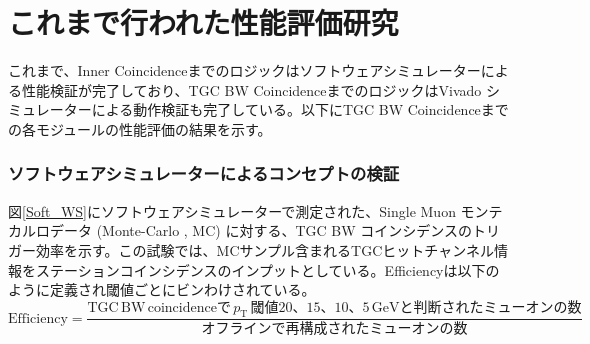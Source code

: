 \section{これまで行われた性能評価研究}
これまで、Inner Coincidenceまでのロジックはソフトウェアシミュレーターによる性能検証が完了しており、TGC BW CoincidenceまでのロジックはVivado シミュレーターによる動作検証も完了している。以下にTGC BW Coincidenceまでの各モジュールの性能評価の結果を示す。

\subsubsection*{ソフトウェアシミュレーターによるコンセプトの検証}
図\ref{Soft_WS}にソフトウェアシミュレーターで測定された、Single Muon モンテカルロデータ (Monte-Carlo , MC) に対する、TGC BW コインシデンスのトリガー効率を示す。この試験では、MCサンプル含まれるTGCヒットチャンネル情報をステーションコインシデンスのインプットとしている。Efficiencyは以下のように定義され\pt 閾値ごとにビンわけされている。
\begin{equation}
    \mathrm{Efficiency} = \frac{\mathrm{TGC\,BW\,coincidenceで}\,p_{\mathrm{T}}\,閾値20、15、10、5\,\mathrm{GeV}と判断されたミューオンの数}{オフラインで再構成されたミューオンの数}
\end{equation}

